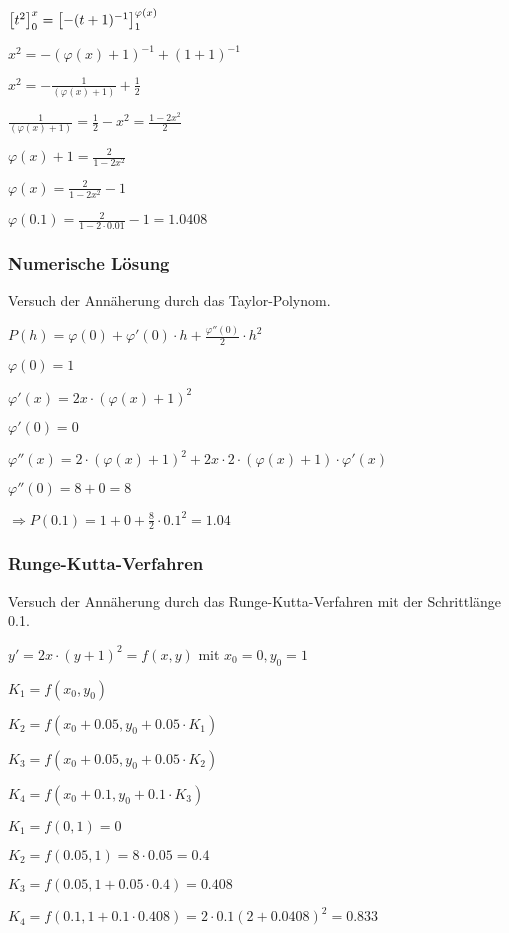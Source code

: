 $  \left[ t^2 \right] _0^x =  \left[ -(t+1)^{-1} \right] _1^{\varphi(x)} $

$ x^2 = -(\varphi(x) + 1)^{-1} + (1+1)^{-1} $

$ x^2 = - \frac{1}{(\varphi(x) + 1)} + \frac{1}{2} $

$ \frac{1}{(\varphi(x) + 1)} = \frac{1}{2} - x^2 = \frac{1 - 2x^2}{2} $

$ \varphi(x) + 1 = \frac{2}{1-2x^2} $

$ \varphi(x) = \frac{2}{1-2x^2} - 1 $

\textbf{$ \varphi(0.1) = \frac{2}{1-2\cdot 0.01} - 1 = 1.0408$}

\subsubsection{Numerische Lösung}
Versuch der Annäherung durch das Taylor-Polynom. 

$ P(h) = \varphi(0) + \varphi'(0) \cdot h + \frac{\varphi''(0)}{2} \cdot h^2 $

$ \varphi(0) = 1 $

$ \varphi'(x) = 2x \cdot (\varphi(x) +1)^2 $

$ \varphi'(0) = 0 $

$ \varphi''(x) = 2 \cdot (\varphi(x) +1)^2 + 2x \cdot 2\cdot (\varphi(x) + 1) \cdot \varphi'(x) $

$ \varphi''(0) = 8 + 0 = 8$

$\Rightarrow P(0.1) = 1 + 0 + \frac{8}{2} \cdot 0.1^2 = 1.04$

\subsubsection{Runge-Kutta-Verfahren}
Versuch der Annäherung durch das Runge-Kutta-Verfahren mit der Schrittlänge 0.1. 

$ y' = 2x \cdot (y+1)^2 = f(x,y)$ mit $x_0=0, y_0=1$

$K_1 = f(x_0, y_0) $

$K_2 = f(x_0 + 0.05, y_0 + 0.05\cdot K_1) $

$K_3 = f(x_0 + 0.05, y_0 + 0.05\cdot K_2) $

$K_4 = f(x_0 + 0.1, y_0 + 0.1\cdot K_3) $

$ K_1 = f(0, 1) = 0 $

$ K_2 = f(0.05, 1) = 8 \cdot 0.05 = 0.4 $

$ K_3 = f(0.05, 1 + 0.05 \cdot 0.4) = 0.408 $

$ K_4 = f(0.1, 1 + 0.1 \cdot 0.408) = 2 \cdot 0.1 (2 + 0.0408)^2 = 0.833 $

